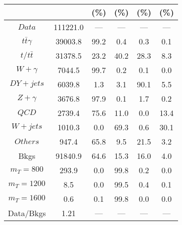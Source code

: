\begin{figure}
\begin{minipage}[c]{0.32\textwidth}
{\begin{tabular}{cccccc}
 &  & (\%) & (\%) & (\%) & (\%)  \\
\hline
                                                                      $ Data $ &  111221.0 &  --- &  --- &  --- &  ---\\
$ t\bar{t}\gamma $ &  39003.8 &  99.2 &  0.4 &  0.3 &  0.1\\
$ t/t\bar{t} $ &  31378.5 &  23.2 &  40.2 &  28.3 &  8.3\\
$ W+\gamma $ &  7044.5 &  99.7 &  0.2 &  0.1 &  0.0\\
$ DY+jets $ &  6039.8 &  1.3 &  3.1 &  90.1 &  5.5\\
$ Z+\gamma $ &  3676.8 &  97.9 &  0.1 &  1.7 &  0.2\\
$ QCD $ &  2739.4 &  75.6 &  11.0 &  0.0 &  13.4\\
$ W+jets $ &  1010.3 &  0.0 &  69.3 &  0.6 &  30.1\\
$ Others $ &  947.4 &  65.8 &  9.5 &  21.5 &  3.2\\
Bkgs &  91840.9 &  64.6 &  15.3 &  16.0 &  4.0\\
$ m_{T} = 800 $ &  293.9 &  0.0 &  99.8 &  0.2 &  0.0\\
$ m_{T} = 1200 $ &  8.5 &  0.0 &  99.5 &  0.4 &  0.1\\
$ m_{T} = 1600 $ &  0.6 &  0.1 &  99.8 &  0.0 &  0.0\\
Data/Bkgs &  1.21 &  --- &  --- &  --- &  ---\\
\hline
\end{tabular}
}
\end{minipage}
\end{figure}

